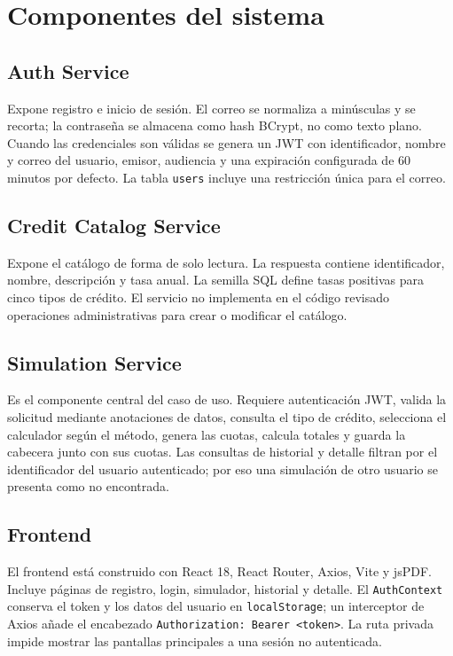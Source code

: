 \documentclass[12pt,a4paper]{article}
\begin{document}
\section{Componentes del sistema}

\subsection{Auth Service}

Expone registro e inicio de sesión. El correo se normaliza a minúsculas y se
recorta; la contraseña se almacena como hash BCrypt, no como texto plano.
Cuando las credenciales son válidas se genera un JWT con identificador,
nombre y correo del usuario, emisor, audiencia y una expiración configurada de
60 minutos por defecto. La tabla \texttt{users} incluye una restricción única
para el correo.

\subsection{Credit Catalog Service}

Expone el catálogo de forma de solo lectura. La respuesta contiene identificador,
nombre, descripción y tasa anual. La semilla SQL define tasas positivas para
cinco tipos de crédito. El servicio no implementa en el código revisado
operaciones administrativas para crear o modificar el catálogo.

\subsection{Simulation Service}

Es el componente central del caso de uso. Requiere autenticación JWT,
valida la solicitud mediante anotaciones de datos, consulta el tipo de crédito,
selecciona el calculador según el método, genera las cuotas, calcula totales y
guarda la cabecera junto con sus cuotas. Las consultas de historial y detalle
filtran por el identificador del usuario autenticado; por eso una simulación
de otro usuario se presenta como no encontrada.

\subsection{Frontend}

El frontend está construido con React 18, React Router, Axios, Vite y jsPDF.
Incluye páginas de registro, login, simulador, historial y detalle. El
\texttt{AuthContext} conserva el token y los datos del usuario en
\texttt{localStorage}; un interceptor de Axios añade el encabezado
\texttt{Authorization: Bearer <token>}. La ruta privada impide mostrar las
pantallas principales a una sesión no autenticada.
\end{document}
